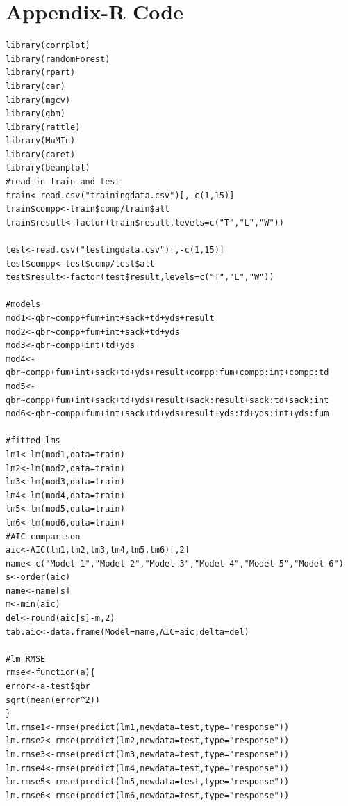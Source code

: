 \documentclass[12pt]{article}\usepackage[]{graphicx}\usepackage[]{color}
\begin{document}
\nocite{*}

\newpage
\begin{flushleft}


\end{flushleft}

\newpage
\section{Appendix-R Code}
\singlespacing
\begin{lstlisting}
library(corrplot)
library(randomForest)
library(rpart)
library(car)
library(mgcv)
library(gbm)
library(rattle)
library(MuMIn)
library(caret)
library(beanplot)
#read in train and test
train<-read.csv("trainingdata.csv")[,-c(1,15)]
train$compp<-train$comp/train$att
train$result<-factor(train$result,levels=c("T","L","W"))

test<-read.csv("testingdata.csv")[,-c(1,15)]
test$compp<-test$comp/test$att
test$result<-factor(test$result,levels=c("T","L","W"))

#models
mod1<-qbr~compp+fum+int+sack+td+yds+result
mod2<-qbr~compp+fum+int+sack+td+yds
mod3<-qbr~compp+int+td+yds
mod4<-qbr~compp+fum+int+sack+td+yds+result+compp:fum+compp:int+compp:td
mod5<-qbr~compp+fum+int+sack+td+yds+result+sack:result+sack:td+sack:int
mod6<-qbr~compp+fum+int+sack+td+yds+result+yds:td+yds:int+yds:fum

#fitted lms
lm1<-lm(mod1,data=train)
lm2<-lm(mod2,data=train)
lm3<-lm(mod3,data=train)
lm4<-lm(mod4,data=train)
lm5<-lm(mod5,data=train)
lm6<-lm(mod6,data=train)
#AIC comparison
aic<-AIC(lm1,lm2,lm3,lm4,lm5,lm6)[,2]
name<-c("Model 1","Model 2","Model 3","Model 4","Model 5","Model 6")
s<-order(aic)
name<-name[s]
m<-min(aic)
del<-round(aic[s]-m,2)
tab.aic<-data.frame(Model=name,AIC=aic,delta=del)

#lm RMSE
rmse<-function(a){
error<-a-test$qbr
sqrt(mean(error^2))
}
lm.rmse1<-rmse(predict(lm1,newdata=test,type="response"))
lm.rmse2<-rmse(predict(lm2,newdata=test,type="response"))
lm.rmse3<-rmse(predict(lm3,newdata=test,type="response"))
lm.rmse4<-rmse(predict(lm4,newdata=test,type="response"))
lm.rmse5<-rmse(predict(lm5,newdata=test,type="response"))
lm.rmse6<-rmse(predict(lm6,newdata=test,type="response"))


\end{lstlisting}
\end{document}
